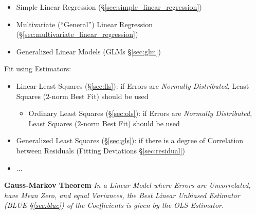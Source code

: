 \begin{itemize}
  \item Simple Linear Regression (\S\ref{sec:simple_linear_regression})
  \item Multivariate (``General'') Linear Regression
    (\S\ref{sec:multivariate_linear_regression})
  \item Generalized Linear Models (GLMs \S\ref{sec:glm})
\end{itemize}

Fit using Estimators:
\begin{itemize}
  \item Linear Least Squares (\S\ref{sec:lls}): if Errors are
    \emph{Normally Distributed}, Least Squares ($2$-norm Best Fit) should be
    used
    \begin{itemize}
      \item Ordinary Least Squares (\S\ref{sec:ols}): if Errors are
        \emph{Normally Distributed}, Least Squares ($2$-norm Best Fit) should be
        used
    \end{itemize}
  \item Generalized Least Squares (\S\ref{sec:gls}): if
    there is a degree of Correlation between Residuals (Fitting Deviations
    \S\ref{sec:residual})
  \item ...
\end{itemize}

\textbf{Gauss-Markov Theorem} \emph{
  In a Linear Model where Errors are Uncorrelated, have Mean Zero, and equal
  Variances, the Best Linear Unbiased Estimator (BLUE \S\ref{sec:blue}) of the
  Coefficients is given by the OLS Estimator.
}

